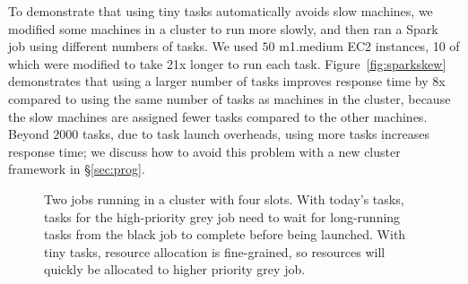 
To demonstrate that using tiny tasks automatically avoids slow machines,
we modified some machines in a cluster to run more slowly, and then
ran a Spark~\cite{zaharia2010spark} job using different numbers of tasks. 
We used $50$ m1.medium EC2
instances, 10 of which were modified to take 21x longer to run each task.
Figure~\ref{fig:sparkskew} demonstrates that using a larger number of tasks
improves response time by 8x compared to using the same number
of tasks as machines in the cluster, because the slow machines are
assigned fewer tasks
compared to the other machines. Beyond $2000$ tasks, due to
task launch overheads, using more tasks increases response time; we discuss
how to avoid this problem with a new cluster framework in \S\ref{sec:prog}.

\begin{figure}[t]
\centering
{}
\vspace{-0.1in}
\caption{Two jobs running in a cluster with four slots. With today's tasks,
tasks for the high-priority grey job need to wait for long-running tasks from the black job to
complete before being launched.
With tiny tasks, resource
allocation is fine-grained, so resources will quickly be allocated to
higher priority grey job.}
\vspace{-2ex}
\label{fig:slot_diagram}
\end{figure}


